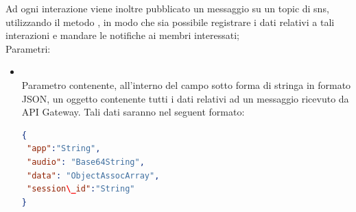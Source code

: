 \begin{itemize}
\begin{itemize}
Ad ogni interazione viene inoltre pubblicato un messaggio su un topic di sns, utilizzando il metodo , in modo che sia possibile registrare i dati relativi a tali interazioni e mandare le notifiche ai membri interessati;\\
		Parametri:
		\begin{itemize}
			\item {} \\
			Parametro contenente, all'interno del campo  sotto forma di stringa in formato JSON, un oggetto contenente tutti i dati relativi ad un messaggio ricevuto da API Gateway. Tali dati saranno nel seguent formato:
\begin{lstlisting}[language=json,firstnumber=1]
{
 "app":"String",
 "audio": "Base64String",
 "data": "ObjectAssocArray",
 "session\_id":"String"
}
\end{lstlisting}


\end{itemize}
\end{itemize}
\end{itemize}
